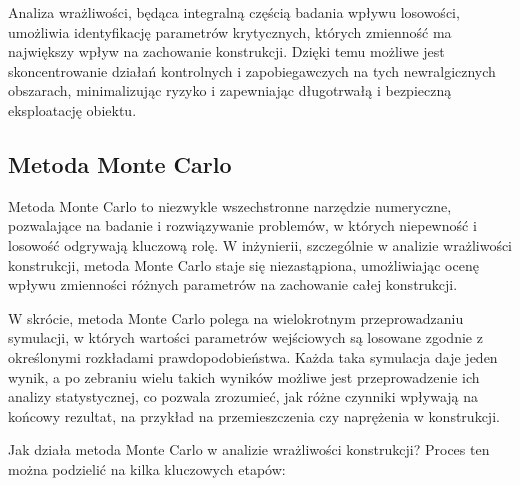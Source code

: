 Analiza wrażliwości, będąca integralną częścią badania wpływu losowości, umożliwia identyfikację parametrów krytycznych, których zmienność ma największy wpływ na zachowanie konstrukcji.
Dzięki temu możliwe jest skoncentrowanie działań kontrolnych i zapobiegawczych na tych newralgicznych obszarach, minimalizując ryzyko i zapewniając długotrwałą i bezpieczną eksploatację obiektu.

\subsection{Metoda Monte Carlo}

Metoda Monte Carlo to niezwykle wszechstronne narzędzie numeryczne, pozwalające na badanie i rozwiązywanie problemów, w których niepewność i losowość odgrywają kluczową rolę.
W inżynierii, szczególnie w analizie wrażliwości konstrukcji, metoda Monte Carlo staje się niezastąpiona, umożliwiając ocenę wpływu zmienności różnych parametrów na zachowanie całej konstrukcji.

W skrócie, metoda Monte Carlo polega na wielokrotnym przeprowadzaniu symulacji, w których wartości parametrów wejściowych są losowane zgodnie z określonymi rozkładami prawdopodobieństwa\cite{montecarlo}.
Każda taka symulacja daje jeden wynik, a po zebraniu wielu takich wyników możliwe jest przeprowadzenie ich analizy statystycznej, co pozwala zrozumieć, jak różne czynniki wpływają na końcowy rezultat, na przykład na przemieszczenia czy naprężenia w konstrukcji.

Jak działa metoda Monte Carlo w analizie wrażliwości konstrukcji?
Proces ten można podzielić na kilka kluczowych etapów:


